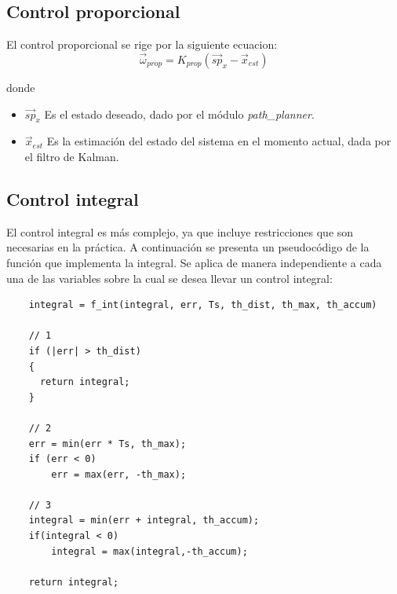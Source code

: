 \documentclass[main]{subfiles}
\begin{document}
\subsection{Control proporcional}
\label{sec:software:control-prop}


El control proporcional se rige por la siguiente ecuacion:
\begin{equation}
  \label{eq:software:prop}
  \vec{\omega}_{prop} = K_{prop} (\vec{sp}_x - \vec{x}_{est})
\end{equation}

donde
\begin{itemize}
\item $\vec{sp}_x$ Es el estado deseado, dado por el m\'odulo \textit{path\_planner}.
\item $\vec{x}_{est}$ Es la estimaci\'on del estado del sistema en el momento actual, dada por el filtro de Kalman.
\end{itemize}

\subsection{Control integral}
\label{sec:software:control-int}

El control integral es m\'as complejo, ya que incluye restricciones que son necesarias en la pr\'actica. A continuaci\'on se presenta un pseudoc\'odigo de la funci\'on que implementa la integral. Se aplica de manera independiente a cada una de las variables sobre la cual se desea llevar un control integral:
\begin{verbatim}
    integral = f_int(integral, err, Ts, th_dist, th_max, th_accum)

    // 1
    if (|err| > th_dist)
    {
      return integral;
    }

    // 2
    err = min(err * Ts, th_max);
    if (err < 0)
        err = max(err, -th_max);

    // 3
    integral = min(err + integral, th_accum);
    if(integral < 0)
        integral = max(integral,-th_accum);

    return integral;
\end{verbatim}
\end{document}
